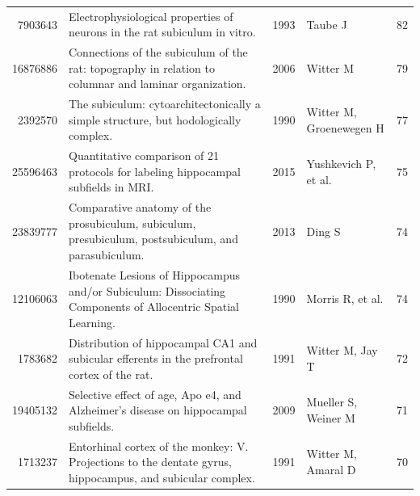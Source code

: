 \documentclass{../latex/analysis_report}
\begin{document}
\begin{longtable}{rp{6cm}lp{2.5cm}r}
7903643 & Electrophysiological properties of neurons in the rat subiculum in vitro. & 1993 & Taube J & 82 \\
16876886 & Connections of the subiculum of the rat: topography in relation to columnar and laminar organization. & 2006 & Witter M & 79 \\
2392570 & The subiculum: cytoarchitectonically a simple structure, but hodologically complex. & 1990 & Witter M, Groenewegen H & 77 \\
25596463 & Quantitative comparison of 21 protocols for labeling hippocampal subfields in MRI. & 2015 & Yushkevich P, et al. & 75 \\
23839777 & Comparative anatomy of the prosubiculum, subiculum, presubiculum, postsubiculum, and parasubiculum. & 2013 & Ding S & 74 \\
12106063 & Ibotenate Lesions of Hippocampus and/or Subiculum: Dissociating Components of Allocentric Spatial Learning. & 1990 & Morris R, et al. & 74 \\
1783682 & Distribution of hippocampal CA1 and subicular efferents in the prefrontal cortex of the rat. & 1991 & Witter M, Jay T & 72 \\
19405132 & Selective effect of age, Apo e4, and Alzheimer's disease on hippocampal subfields. & 2009 & Mueller S, Weiner M & 71 \\
1713237 & Entorhinal cortex of the monkey: V. Projections to the dentate gyrus, hippocampus, and subicular complex. & 1991 & Witter M, Amaral D & 70 \\

\end{longtable}
\end{document}
